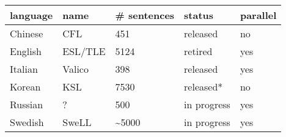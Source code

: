 \begin{longtable}[]{@{}lllll@{}}
\toprule\noalign{}
language & name & \# sentences & status & parallel \\
\midrule\noalign{}
\endhead
\bottomrule\noalign{}
\endlastfoot
Chinese & CFL & 451 & released & no \\
English & ESL/TLE & 5124 & retired & yes \\
Italian & Valico & 398 & released & yes \\
Korean & KSL & 7530 & released* & no \\
Russian & ? & 500 & in progress & yes \\
Swedish & SweLL & \textasciitilde5000 & in progress & yes \\
\end{longtable}
